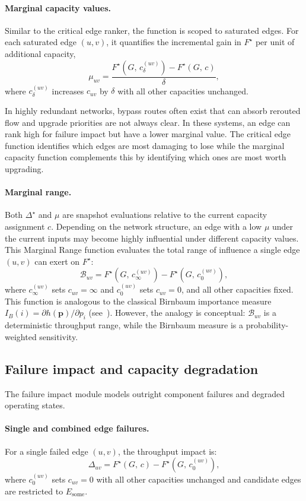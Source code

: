 \documentclass[12pt]{report}
\begin{document}
\paragraph{Marginal capacity values.}
 Similar to the critical edge ranker, the function is scoped to saturated edges. For each saturated edge $(u,v)$, it quantifies the incremental gain in $F^\star$ per unit of additional capacity,
\[
\mu_{uv} = \frac{F^\star(G,\, c^{(uv)}_\delta) - 
F^\star(G,\, c)}{\delta},
\]
where $c^{(uv)}_\delta$ increases $c_{uv}$ by $\delta$ with all other capacities unchanged. 

In highly redundant networks, bypass routes often exist that can absorb rerouted flow and upgrade priorities are not always clear. In these systems, an edge can rank high for failure impact but have a lower marginal value. The critical edge function identifies which edges are most damaging to lose while the marginal capacity function complements this by identifying which ones are most worth upgrading.

\paragraph{Marginal range.}
Both $\Delta^\star$ and $\mu$ are snapshot evaluations relative to the current capacity assignment $c$. Depending on the network structure, an edge with a low $\mu$ under the current inputs may become highly influential under different capacity values. This Marginal Range function evaluates the total range of influence a single edge $(u,v)$ can exert on $F^\star$:
\[
\mathcal{B}_{uv} = F^\star\!\left(G,\, c^{(uv)}_\infty\right) 
- F^\star\!\left(G,\, c^{(uv)}_0\right),
\]
where $c^{(uv)}_\infty$ sets $c_{uv} = \infty$ and $c^{(uv)}_0$ sets $c_{uv} = 0$, and all other capacities fixed. This function is analogous to the classical Birnbaum importance measure
$I_B(i) = \partial h(\mathbf{p})/\partial p_i$ (see~\cite{birnbaum1969}). However, the analogy is conceptual: $\mathcal{B}_{uv}$ is a deterministic throughput range, while the Birnbaum measure is a probability-weighted sensitivity.


\subsection{Failure impact and capacity degradation}
\label{sec:flow-failure}
The failure impact module models outright component failures and degraded operating states. 

\paragraph{Single and combined edge failures.}
For a single failed edge $(u,v)$, the throughput impact is:
\[
\Delta_{uv} = F^\star(G,\, c) - F^\star\!\left(G,\, 
c^{(uv)}_0\right),
\]
where $c^{(uv)}_0$ sets $c_{uv} = 0$ with all other capacities unchanged and candidate edges are restricted to $E_{\text{some}}$.
\end{document}
